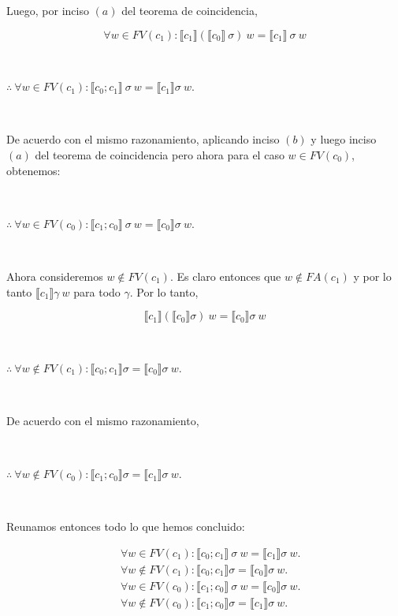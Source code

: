 \documentclass[article, 12pt]{article}
\begin{document}
Luego, por inciso $(a)$ del teorema de coincidencia,

\begin{equation*}
  \forall  w \in FV(c_1) : \llbracket c_1 \rrbracket\left( \llbracket c_0 \rrbracket ~ \sigma\right)   ~ w
  = \llbracket c_1 \rrbracket ~ \sigma ~ w
\end{equation*}

~

$\therefore ~ \forall w \in FV(c_1) : \llbracket c_0;c_1 \rrbracket ~ \sigma ~  w =
\llbracket c_1 \rrbracket \sigma ~ w$.

~

De acuerdo con el mismo razonamiento, aplicando inciso $(b)$ y luego inciso
$(a)$ del teorema de coincidencia pero ahora para el caso $w \in FV(c_0)$,
obtenemos:

~

$\therefore  ~ \forall  w \in FV(c_0) : \llbracket c_1;c_0 \rrbracket ~ \sigma ~
w = \llbracket c_0 \rrbracket\sigma ~ w$.

~

Ahora consideremos $w \not\in FV(c_1)$. Es claro entonces que $w \not\in
FA(c_1)$ y por lo tanto $\llbracket c_1 \rrbracket \gamma ~ w$ para todo
$\gamma$. Por lo tanto, 

\begin{equation*}
  \llbracket c_1 \rrbracket \left( \llbracket c_0 \rrbracket\sigma \right) ~ w =
  \llbracket c_0 \rrbracket\sigma ~ w
\end{equation*}

~

$\therefore ~ \forall  w \not\in FV(c_1) : \llbracket c_0;c_1 \rrbracket\sigma =
\llbracket c_0 \rrbracket\sigma ~ w$.


~

De acuerdo con el mismo razonamiento,

~
~

$\therefore ~ \forall  w \not\in FV(c_0) : \llbracket c_1;c_0 \rrbracket\sigma =
\llbracket c_1 \rrbracket\sigma ~ w$.

~

Reunamos entonces todo lo que hemos concluido:

\begin{align*}
 &~ \forall w \in FV(c_1) : \llbracket c_0;c_1 \rrbracket ~ \sigma ~  w =
\llbracket c_1 \rrbracket \sigma ~ w.\\
 &~ \forall  w \not\in FV(c_1) : \llbracket c_0;c_1 \rrbracket\sigma =
\llbracket c_0 \rrbracket\sigma ~ w.\\
 & ~ \forall  w \in FV(c_0) : \llbracket c_1;c_0 \rrbracket ~ \sigma ~
w = \llbracket c_0 \rrbracket\sigma ~ w.\\
 &~ \forall  w \not\in FV(c_0) : \llbracket c_1;c_0 \rrbracket\sigma =
\llbracket c_1 \rrbracket\sigma ~ w.
\end{align*}
~
\end{document}
